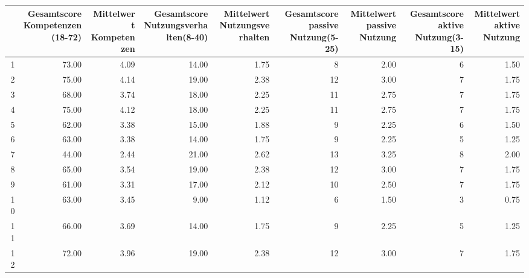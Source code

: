 \begin{table}[ht]
\centering
\begin{tabular}{rrrrrrrrr}
  \hline
 & Gesamtscore Kompetenzen(18-72) & Mittelwert Kompetenzen & Gesamtscore Nutzungsverhalten(8-40) & Mittelwert Nutzungsverhalten & Gesamtscore passive Nutzung(5-25) & Mittelwert passive Nutzung & Gesamtscore aktive Nutzung(3-15) & Mittelwert aktive Nutzung \\
  \hline
1 & 73.00 & 4.09 & 14.00 & 1.75 &   8 & 2.00 &   6 & 1.50 \\
  2 & 75.00 & 4.14 & 19.00 & 2.38 &  12 & 3.00 &   7 & 1.75 \\
  3 & 68.00 & 3.74 & 18.00 & 2.25 &  11 & 2.75 &   7 & 1.75 \\
  4 & 75.00 & 4.12 & 18.00 & 2.25 &  11 & 2.75 &   7 & 1.75 \\
  5 & 62.00 & 3.38 & 15.00 & 1.88 &   9 & 2.25 &   6 & 1.50 \\
  6 & 63.00 & 3.38 & 14.00 & 1.75 &   9 & 2.25 &   5 & 1.25 \\
  7 & 44.00 & 2.44 & 21.00 & 2.62 &  13 & 3.25 &   8 & 2.00 \\
  8 & 65.00 & 3.54 & 19.00 & 2.38 &  12 & 3.00 &   7 & 1.75 \\
  9 & 61.00 & 3.31 & 17.00 & 2.12 &  10 & 2.50 &   7 & 1.75 \\
  10 & 63.00 & 3.45 & 9.00 & 1.12 &   6 & 1.50 &   3 & 0.75 \\
  11 & 66.00 & 3.69 & 14.00 & 1.75 &   9 & 2.25 &   5 & 1.25 \\
  12 & 72.00 & 3.96 & 19.00 & 2.38 &  12 & 3.00 &   7 & 1.75 \\
   \hline
\end{tabular}
\end{table}

